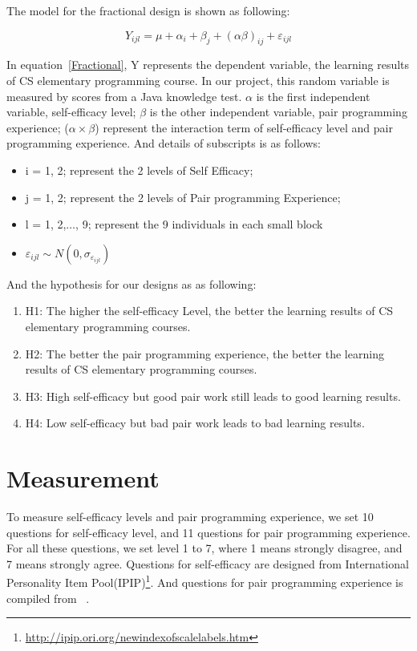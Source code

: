 \documentclass{sigchi}
\begin{document}
The model for the fractional design is shown as following:

\begin{equation}
\label{Fractional}
Y_{ijl} = \mu + \alpha_i + \beta_j + (\alpha \beta)_{ij} + \varepsilon_{ijl}
\end{equation}

In equation~\eqref{Fractional},   Y represents the dependent variable, the learning results of CS elementary programming course. In our project, this random variable is measured by scores from a Java knowledge test. $\alpha$ is the first independent variable, self-efficacy level;  $\beta$ is the other independent variable, pair programming experience; ($\alpha \times \beta$) represent the interaction term of self-efficacy level and pair programming experience. And details of subscripts is as follows:

\begin{itemize}
\item i = 1, 2; represent the 2 levels of Self Efficacy; 
\item j = 1, 2; represent the 2 levels of Pair programming Experience;
\item l = 1, 2,$\dots$, 9; represent the 9 individuals in each small block
\item $\varepsilon_{ijl} \sim  N(0, \sigma_{\varepsilon_{ijl}})$
\end{itemize}

And the hypothesis for our designs as as following:

\begin{enumerate}
\item H1: The higher the self-efficacy Level, the better the learning results of CS elementary programming courses. 
\item H2: The better the pair programming experience, the better the learning results of CS elementary programming courses. 
\item H3: High self-efficacy but good pair work still leads to good learning results.
\item H4: Low self-efficacy but bad pair work leads to bad learning results.
\end{enumerate}


\section{Measurement}
To measure self-efficacy levels and pair programming experience,
we set 10 questions for self-efficacy level, and 11 questions for pair programming experience. For all these questions, we set level 1 to 7, where 1 means strongly disagree, and 7 means strongly agree. Questions for self-efficacy are designed from International Personality Item Pool(IPIP)\footnote{\url{http://ipip.ori.org/newindexofscalelabels.htm}}. And questions for pair programming experience is compiled from ~\cite{salleh2014investigating}.
\end{document}
